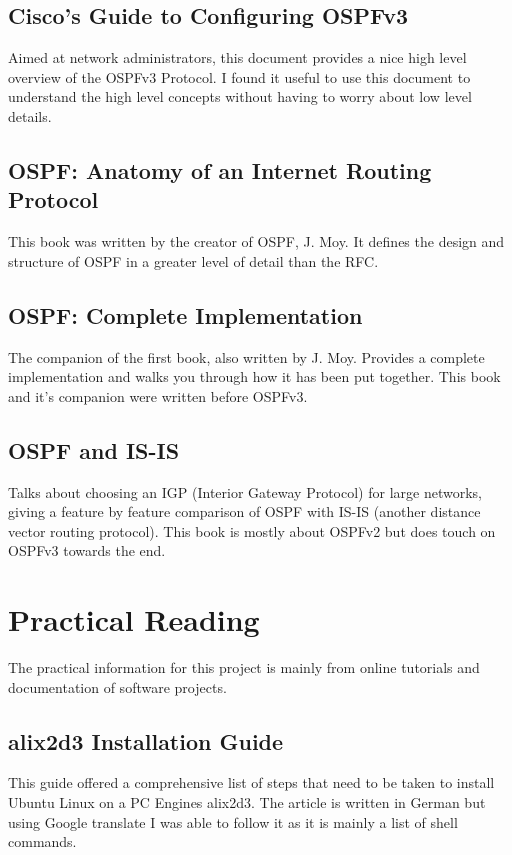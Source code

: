 \documentclass[12pt]{report}
\begin{document}
\subsection{Cisco's Guide to Configuring OSPFv3}
Aimed at network administrators, this document provides a nice high level
overview of the OSPFv3 Protocol\cite{CiscoOSPFv3Guide}. I found it useful to use
this document to understand the high level concepts without having to worry
about low level details.

\subsection{OSPF: Anatomy of an Internet Routing Protocol}
This book\cite{OSPFAIRP} was written by the creator of OSPF, J. Moy. It defines
the design and structure of OSPF in a greater level of detail than the RFC.

\subsection{OSPF: Complete Implementation}
The companion of the first book\cite{OSPFCI}, also written by J. Moy. Provides a
complete implementation and walks you through how it has been put together. This
book and it's companion were written before OSPFv3.

\subsection{OSPF and IS-IS}
Talks about choosing an IGP (Interior Gateway Protocol)
 for large networks, giving a
feature by feature comparison of OSPF with IS-IS
(another
distance vector routing protocol). This book is mostly about OSPFv2 but does
touch on OSPFv3 towards the end\cite{OSPFvsISIS}.

\section{Practical Reading}		
The practical information for this project is mainly from online tutorials and
documentation of software projects.  

\subsection{alix2d3 Installation Guide}
This guide\cite{germanGuide} offered a comprehensive list of steps that need to
be taken to install Ubuntu Linux on a PC Engines alix2d3.\cite{alix2d3}  The article is
written in German but using Google translate I was able to follow it as it is
mainly a list of shell commands.
\end{document}
